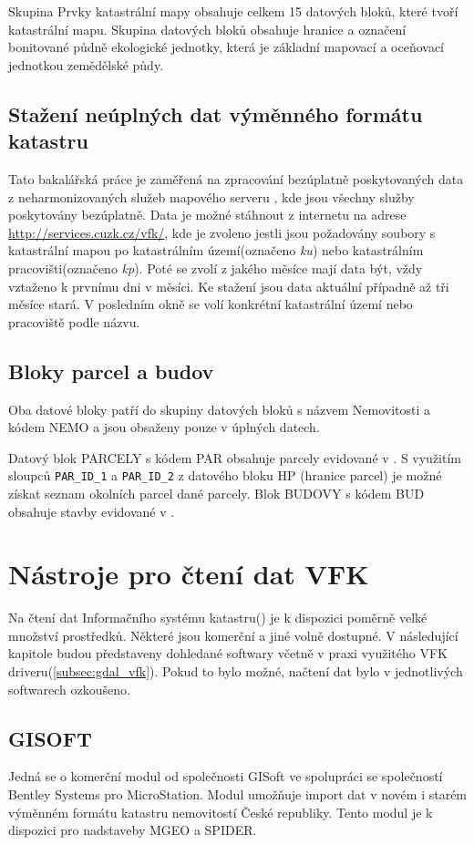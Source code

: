 Skupina Prvky katastrální mapy obsahuje celkem 15 datových bloků,
které tvoří katastrální mapu. Skupina datových bloků 
obsahuje hranice a označení bonitované půdně ekologické jednotky,
která je základní mapovací a oceňovací jednotkou zemědělské půdy.
\subsection{Stažení neúplných dat výměnného formátu katastru}
Tato bakalářská práce je zaměřená na zpracování bezúplatně
poskytovaných data z neharmonizovaných služeb mapového serveru
, kde jsou všechny služby poskytovány bezúplatně. Data je
možné stáhnout z internetu na adrese
\href{http://services.cuzk.cz/vfk/}{http://services.cuzk.cz/vfk/}, kde
je zvoleno jestli jsou požadovány soubory s katastrální mapou po
katastrálním území(označeno \textit{ku}) nebo katastrálním
pracovišti(označeno \textit{kp}). Poté se zvolí z jakého měsíce mají
data být, vždy vztaženo k prvnímu dni v měsíci. Ke stažení jsou data
aktuální případně až tři měsíce stará. V posledním okně se volí
konkrétní katastrální území nebo pracoviště podle názvu.
\subsection{Bloky parcel a budov}
\label{subsec:bloky_par_bud}
Oba datové bloky patří do skupiny datových bloků s názvem Nemovitosti
a kódem NEMO a jsou obsaženy pouze v úplných datech.

Datový blok PARCELY s kódem PAR obsahuje parcely evidované v
. S využitím sloupců \verb|PAR_ID_1| a \verb|PAR_ID_2| z
datového bloku HP (hranice parcel) je možné získat seznam okolních
parcel dané parcely. Blok BUDOVY s kódem BUD obsahuje stavby evidované
v .
 
\section{Nástroje pro čtení dat VFK} 
Na čtení dat Informačního systému katastru() je k dispozici
poměrně velké množství prostředků. Některé jsou komerční a jiné volně
dostupné. V následující kapitole budou představeny dohledané softwary
včetně v praxi využitého VFK driveru(\ref{subsec:gdal_vfk}). Pokud to
bylo možné, načtení dat bylo v jednotlivých softwarech ozkoušeno.
\subsection{GISOFT}
Jedná se o komerční modul od společnosti GISoft ve spolupráci se
společností Bentley Systems pro MicroStation. Modul umožňuje import
dat v novém i starém výměnném formátu katastru nemovitostí České
republiky. Tento modul je k dispozici pro nadstaveby MGEO a
SPIDER.\cite{gisoft}

